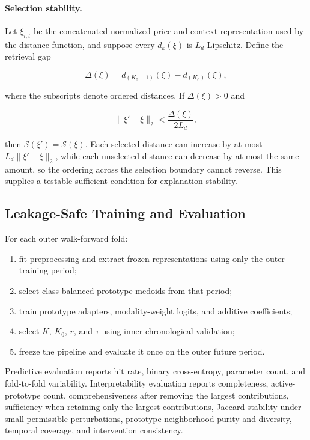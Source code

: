 \documentclass[11pt]{article}
\begin{document}
\paragraph{Selection stability.}
Let $\xi_{i,t}$ be the concatenated normalized price and context
representation used by the distance function, and suppose every
$d_k(\xi)$ is $L_d$-Lipschitz. Define the retrieval gap

\begin{equation}
\Delta(\xi)
=
d_{(K_0+1)}(\xi)
-
d_{(K_0)}(\xi),
\end{equation}

where the subscripts denote ordered distances. If $\Delta(\xi)>0$ and

\begin{equation}
\|\xi'-\xi\|_2
<
\frac{\Delta(\xi)}{2L_d},
\end{equation}

then $\mathcal S(\xi')=\mathcal S(\xi)$. Each selected distance can increase
by at most $L_d\|\xi'-\xi\|_2$, while each unselected distance can decrease by
at most the same amount, so the ordering across the selection boundary cannot
reverse. This supplies a testable sufficient condition for explanation
stability.

\subsection{Leakage-Safe Training and Evaluation}

For each outer walk-forward fold:

\begin{enumerate}
    \item fit preprocessing and extract frozen representations using only the
    outer training period;

    \item select class-balanced prototype medoids from that period;

    \item train prototype adapters, modality-weight logits, and additive
    coefficients;

    \item select $K$, $K_0$, $r$, and $\tau$ using inner chronological
    validation;

    \item freeze the pipeline and evaluate it once on the outer future period.
\end{enumerate}

Predictive evaluation reports hit rate, binary cross-entropy, parameter count,
and fold-to-fold variability. Interpretability evaluation reports
completeness, active-prototype count, comprehensiveness after removing the
largest contributions, sufficiency when retaining only the largest
contributions, Jaccard stability under small permissible perturbations,
prototype-neighborhood purity and diversity, temporal coverage, and
intervention consistency.
\end{document}
